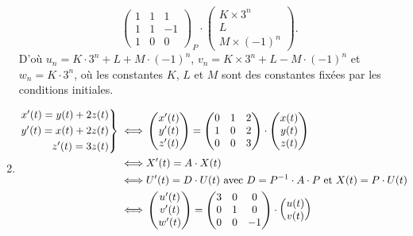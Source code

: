 \begin{exo}
\begin{enumerate}
\[{\begin{pmatrix}
					1&1&1\\
					1&1&-1\\
					1&0&0
				\end{pmatrix}}_P \cdot \begin{pmatrix}
					K\times 3^n\\
					L\\
					M\times (-1)^n
				\end{pmatrix}
			.\] D'où $u_n = K\cdot 3^n + L + M \cdot (-1)^n$, $v_n = K\times 3^n + L - M \cdot (-1)^n$\/ et $w_n = K\cdot 3^n$, où les constantes $K$, $L$\/ et $M$\/ sont des constantes fixées par les conditions initiales.
		\item
			\begin{align*}
				\begin{rcases*}
					\hfill x'(t) = y(t) + 2z(t)\\
					\hfill y'(t) = x(t) + 2z(t)\\
					\hfill z'(t) = 3z(t)
				\end{rcases*} \iff& \begin{pmatrix}
					x'(t)\\
					y'(t)\\
					z'(t)
				\end{pmatrix} = \begin{pmatrix}
					0&1&2\\
					1&0&2\\
					0&0&3
				\end{pmatrix} \cdot \begin{pmatrix}
					x(t)\\
					y(t)\\
					z(t)
				\end{pmatrix}\\
				\iff& X'(t) = A\cdot X(t)\\
				\iff& U'(t) = D \cdot U(t) \text{ avec } D = P^{-1} \cdot A\cdot P \text{ et } X(t) = P\cdot U(t)\\
				\iff& \begin{pmatrix}
					u'(t)\\
					v'(t)\\
					w'(t)
				\end{pmatrix} = \begin{pmatrix}
					3&0&0\\
					0&1&0\\
					0&0&-1
				\end{pmatrix} \cdot \begin{pmatrix}
					u(t)\\
					v(t)\\

\end{pmatrix}
\end{align*}
\end{enumerate}
\end{exo}
